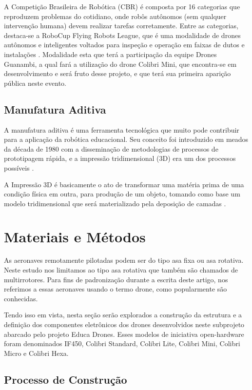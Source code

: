 \documentclass[conference]{IEEEtran}
\begin{document}
A Competição Brasileira de Robótica (CBR) é composta por 16 categorias que reproduzem problemas do cotidiano, onde robôs autônomos (sem qualquer intervenção humana) devem realizar tarefas corretamente. Entre as categorias, destaca-se a RoboCup Flying Robots League, que é uma modalidade de drones autônomos e inteligentes voltados para inspeção e operação em faixas de dutos e instalações \cite{b3}. Modalidade esta que terá a participação da equipe Drones Guanambi, a qual fará a utilização do drone Colibri Mini, que encontra-se em desenvolvimento e será fruto desse projeto, e que terá sua primeira aparição pública neste evento.

\subsection{Manufatura Aditiva}

A manufatura aditiva é uma ferramenta tecnológica que muito pode contribuir para a aplicação da robótica educacional. Seu conceito foi introduzido em meados da década de 1980 com a disseminação de metodologias de processos de prototipagem rápida, e a impressão tridimensional (3D) era um dos processos possíveis \cite{b10}.

A Impressão 3D é basicamente o ato de transformar uma matéria prima de uma condição física em outra, para produção de um objeto, tomando como base um modelo tridimensional que será materializado pela deposição de camadas \cite{b8}.

\section{Materiais e Métodos}

As aeronaves remotamente pilotadas podem ser do tipo asa fixa ou asa rotativa. Neste estudo nos limitamos ao tipo asa rotativa que também são chamados de multirrotores. Para fins de padronização durante a escrita deste artigo, nos referimos a essas aeronaves usando o termo drone, como popularmente são conhecidas.

Tendo isso em vista, nesta seção serão explorados a construção da estrutura e a definição dos componentes eletrônicos dos drones desenvolvidos neste subprojeto abarcado pelo projeto Educa Drones. Esses modelos de iniciativa open-hardware foram denominados IF450, Colibri Standard, Colibri Lite, Colibri Mini, Colibri Micro e Colibri Hexa.


\subsection{Processo de Construção}
\end{document}
